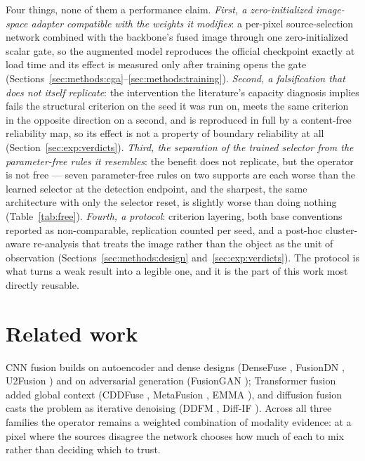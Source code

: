 \documentclass[pdflatex,sn-mathphys-num]{sn-jnl}
\theoremstyle{thmstyleone}%
\theoremstyle{thmstyletwo}%
\theoremstyle{thmstylethree}%
\begin{document}
Four things, none of them a performance claim. \emph{First, a zero-initialized image-space adapter compatible with the weights it modifies}: a per-pixel source-selection network combined with the backbone's fused image through one zero-initialized scalar gate, so the augmented model reproduces the official checkpoint exactly at load time and its effect is measured only after training opens the gate (Sections~\ref{sec:methods:cga}--\ref{sec:methods:training}). \emph{Second, a falsification that does not itself replicate}: the intervention the literature's capacity diagnosis implies fails the structural criterion on the seed it was run on, meets the same criterion in the opposite direction on a second, and is reproduced in full by a content-free reliability map, so its effect is not a property of boundary reliability at all (Section~\ref{sec:exp:verdicts}). \emph{Third, the separation of the trained selector from the parameter-free rules it resembles}: the benefit does not replicate, but the operator is not free --- seven parameter-free rules on two supports are each worse than the learned selector at the detection endpoint, and the sharpest, the same architecture with only the selector reset, is slightly worse than doing nothing (Table~\ref{tab:free}). \emph{Fourth, a protocol}: criterion layering, both base conventions reported as non-comparable, replication counted per seed, and a post-hoc cluster-aware re-analysis that treats the image rather than the object as the unit of observation (Sections~\ref{sec:methods:design} and~\ref{sec:exp:verdicts}). The protocol is what turns a weak result into a legible one, and it is the part of this work most directly reusable.

\section{Related work}\label{sec:related}

CNN fusion builds on autoencoder and dense designs (DenseFuse \cite{li2019densefuse}, FusionDN \cite{xu2020fusiondn}, U2Fusion \cite{xu2022u2fusion}) and on adversarial generation (FusionGAN \cite{ma2019fusiongan}); Transformer fusion added global context (CDDFuse \cite{zhao2023cddfuse}, MetaFusion \cite{zhao2023metafusion}, EMMA \cite{zhao2024equivariant}), and diffusion fusion casts the problem as iterative denoising (DDFM \cite{zhao2023ddfm}, Diff-IF \cite{yi2024diffif}). Across all three families the operator remains a weighted combination of modality evidence: at a pixel where the sources disagree the network chooses how much of each to mix rather than deciding which to trust.
\end{document}
